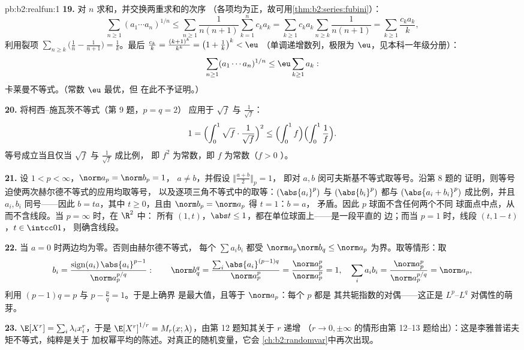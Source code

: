\begin{solution}{pb:b2:realfun:1}
\textbf{19.} 对 $n$ 求和，并交换两重求和的次序
（各项均为正，故可用\cref{thm:b2:series:fubini}）：
\[
\sum_{n\geq1}(a_1\cdots a_n)^{1/n}
\leq \sum_{n\geq1}\frac{1}{n(n+1)}\sum_{k=1}^{n}c_ka_k
= \sum_{k\geq1}c_ka_k\sum_{n\geq k}\frac1{n(n+1)}
= \sum_{k\geq1}\frac{c_ka_k}{k},
\]
利用裂项 $\sum_{n\geq k}\bigl(\frac1n -
\frac1{n+1}\bigr) = \frac1k$。最后 $\frac{c_k}k =
\frac{(k+1)^k}{k^k} = \bigl(1 + \frac1k\bigr)^k < \eu$
（单调递增数列，极限为 $\eu$，见本科一年级分册）：
\[
\sum_{n\geq1}(a_1\cdots a_n)^{1/n} \leq
\eu\sum_{k\geq1}a_k :
\]
卡莱曼不等式。（常数 $\eu$ 最优，但
在此不予证明。）

\textbf{20.} 将柯西--施瓦茨不等式（第 9 题，$p = q = 2$）
应用于 $\sqrt f$ 与 $\frac1{\sqrt f}$：
\[
1 = \Bigl(\int_0^1\sqrt f\cdot\frac{1}{\sqrt f}\Bigr)^{2}
\leq \Bigl(\int_0^1 f\Bigr)\Bigl(\int_0^1\frac1f\Bigr).
\]
等号成立当且仅当 $\sqrt f$ 与 $\frac1{\sqrt f}$ 成比例，
即 $f^2$ 为常数，即 $f$ 为常数（$f > 0$ ）。

\textbf{21.} 设 $1 < p < \infty$，$\norm a_p = \norm b_p = 1$，
$a \neq b$，并假设 $\bigl\Vert\frac{a+b}2\bigr\Vert_p = 1$，
即对 $a, b$ 闵可夫斯基不等式取等号。沿第 8 题的
证明，则等号迫使两次赫尔德不等式的应用均取等号，
以及逐项三角不等式中的取等：$(\abs{a_i}^p)$ 与
$(\abs{b_i}^p)$ 都与 $(\abs{a_i + b_i}^p)$ 成比例，并且
$a_i, b_i$ 同号——因此 $b = ta$，其中 $t \geq
0$，且由 $\norm b_p = \norm a_p$ 得 $t = 1$：$b = a$，
矛盾。因此 $p$ 球面不含任何两个不同
球面点中点，从而不含线段。当 $p = \infty$ 时，在 $\R^2$ 中：
所有 $(1, t)$，$\abs t \leq 1$，都在单位球面上——是一段平直的
边；而当 $p = 1$ 时，线段 $(t, 1 - t)$，$t \in \intcc01$，
则确含线段。

\textbf{22.} 当 $a = 0$ 时两边均为零。否则由赫尔德不等式，
每个 $\sum a_ib_i$ 都受 $\norm a_p\norm b_q \leq \norm
a_p$ 为界。取等情形：取
\[
b_i = \frac{\operatorname{sign}(a_i)\,\abs{a_i}^{p-1}}
{\norm a_p^{p/q}} :
\qquad
\norm b_q^q = \frac{\sum_i\abs{a_i}^{(p-1)q}}{\norm a_p^{p}}
= \frac{\norm a_p^p}{\norm a_p^p} = 1,
\quad
\sum_ia_ib_i = \frac{\norm a_p^p}{\norm a_p^{p/q}} =
\norm a_p ,
\]
利用 $(p-1)q = p$ 与 $p - \frac pq = 1$。于是上确界
是最大值，且等于 $\norm a_p$：每个 $p$ 都是
其共轭指数的对偶——这正是 $L^p$--$L^q$ 对偶性的萌芽。

\textbf{23.} $\E[X^r] = \sum_i\lambda_ix_i^r$，于是
$\E[X^r]^{1/r} = M_r(x; \lambda)$，由第 12 题知其关于 $r$ 递增
（$r \to 0, \pm\infty$ 的情形由第
12--13 题给出）：这是李雅普诺夫矩不等式，纯粹是关于
加权幂平均的陈述。对真正的随机变量，它会
\cref{ch:b2:randomvar}中再次出现。


\end{solution}
